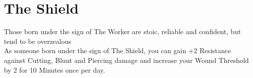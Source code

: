 \section{The Shield}

Those born under the sign of The Worker are stoic, reliable and confident, but tend to be overzealous\\
As someone born under the sign of The Shield, you can gain +2 Resistance against Cutting, Blunt and Piercing damage and increase your Wound Threshold by 2 for 10 Minutes once per day.\\